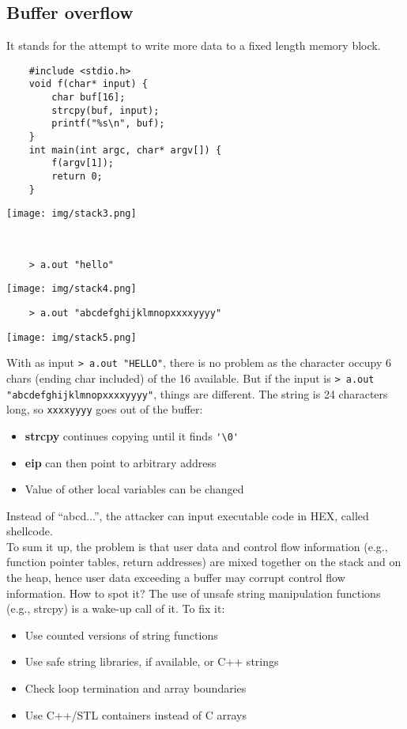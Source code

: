 \documentclass[a4paper, 10pt, titlepage]{article}
\begin{document}
	\subsection*{Buffer overflow}
	It stands for the attempt to write more data to a fixed length memory block.
	
	\begin{minipage}{0.6\textwidth}
	\begin{lstlisting}
	#include <stdio.h>
	void f(char* input) {
		char buf[16];
		strcpy(buf, input);
		printf("%s\n", buf);
	}
	int main(int argc, char* argv[]) {
		f(argv[1]);
		return 0;
	}
	\end{lstlisting}
	\end{minipage}
	\begin{minipage}{0.3\textwidth}
	\texttt{[image: img/stack3.png]}
	\end{minipage}\bigskip \\ 
	\begin{minipage}{0.45\textwidth}
	\begin{verbatim}
	> a.out "hello"
	\end{verbatim} \medskip
	\texttt{[image: img/stack4.png]}
	\end{minipage}
	\begin{minipage}{0.45\textwidth}
	\begin{verbatim}
	> a.out "abcdefghijklmnopxxxxyyyy"
	\end{verbatim} \medskip
	\texttt{[image: img/stack5.png]}
	\end{minipage}
	
With as input \lstinline|> a.out "HELLO"|, there is no problem as the character occupy 6 chars (ending char included) of the 16 available. But if the input is \lstinline|> a.out "abcdefghijklmnopxxxxyyyy"|, things are different. The string is 24 characters long, so \lstinline|xxxxyyyy| goes out of the buffer:
\begin{itemize}
\item \textbf{strcpy} continues copying until it finds \lstinline|'\0'|
\item \textbf{eip} can then point to arbitrary address
\item Value of other local variables can be changed
\end{itemize}
Instead of “abcd...”, the attacker can input executable code in HEX,
called shellcode. \\
To sum it up, the problem is that user data and control flow information (e.g., function pointer tables, return addresses) are mixed together on the stack and on the heap, hence user data exceeding a buffer may corrupt control flow information. How to spot it? The use of unsafe string manipulation functions (e.g., strcpy) is a wake-up call of it. To fix it:
\begin{itemize}
\item Use counted versions of string functions
\item Use safe string libraries, if available, or C++ strings
\item Check loop termination and array boundaries
\item Use C++/STL containers instead of C arrays
\end{itemize}
\end{document}
